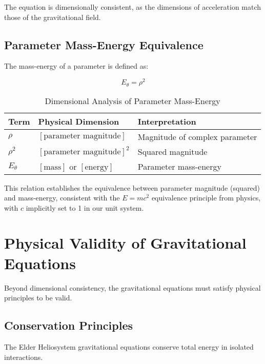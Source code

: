 The equation is dimensionally consistent, as the dimensions of acceleration match those of the gravitational field.

\subsection{Parameter Mass-Energy Equivalence}

The mass-energy of a parameter is defined as:

\begin{equation}
E_{\theta} = \rho^2
\end{equation}

\begin{table}[h]
\centering
\caption{Dimensional Analysis of Parameter Mass-Energy}
\label{tab:dimensional_analysis_mass_energy}
\begin{tabular}{p{3cm} p{5cm} p{6cm}}
\textbf{Term} & \textbf{Physical Dimension} & \textbf{Interpretation} \\
\hline
$\rho$ & $[\text{parameter magnitude}]$ & Magnitude of complex parameter \\
$\rho^2$ & $[\text{parameter magnitude}]^2$ & Squared magnitude \\
$E_{\theta}$ & $[\text{mass}]$ or $[\text{energy}]$ & Parameter mass-energy \\
\hline
\end{tabular}
\end{table}

This relation establishes the equivalence between parameter magnitude (squared) and mass-energy, consistent with the $E = mc^2$ equivalence principle from physics, with $c$ implicitly set to 1 in our unit system.

\section{Physical Validity of Gravitational Equations}

Beyond dimensional consistency, the gravitational equations must satisfy physical principles to be valid.

\subsection{Conservation Principles}

\begin{theorem}
The Elder Heliosystem gravitational equations conserve total energy in isolated interactions.
\end{theorem}

